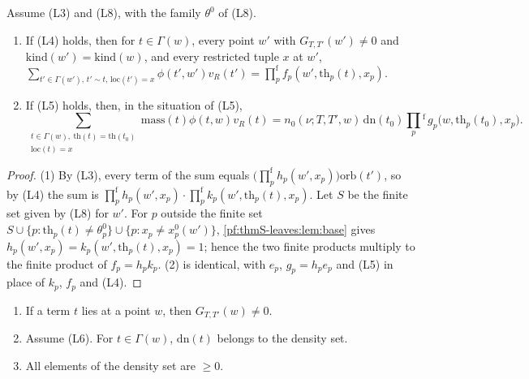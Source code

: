 \begin{proposition}\label{pf:thmS-leaves:prop:tuple}
Assume (L3) and (L8), with the family $\theta^0$ of (L8).
\begin{enumerate}
\item If (L4) holds, then for $t\in\Gamma(w)$, every point $w'$ with $G_{T,T'}(w')\ne0$ and $\mathrm{kind}(w')=\mathrm{kind}(w)$, and
every restricted tuple $x$ at $w'$,
$\sum_{t'\in\Gamma(w'),\,t'\sim t,\,\mathrm{loc}(t')=x}\phi(t',w')v_R(t')=\prod^{\mathrm f}_pf_p(w',\mathrm{th}_p(t),x_p)$.
\item If (L5) holds, then, in the situation of (L5),
\[
\sum_{\substack{t\in\Gamma(w),\ \mathrm{th}(t)=\mathrm{th}(t_0)\\ \mathrm{loc}(t)=x}}\mathrm{mass}(t)\phi(t,w)v_R(t)
=n_0(\nu;T,T',w)\,\mathrm{dn}(t_0)\prod_p{}^{\mathrm f}\,g_p\bigl(w,\mathrm{th}_p(t_0),x_p\bigr).
\]
\end{enumerate}
\end{proposition}

\begin{proof}
(1) By (L3), every term of the sum equals $\bigl(\prod^{\mathrm f}_ph_p(w',x_p)\bigr)\mathrm{orb}(t')$, so by (L4) the sum is
$\prod^{\mathrm f}_ph_p(w',x_p)\cdot\prod^{\mathrm f}_pk_p(w',\mathrm{th}_p(t),x_p)$. Let $S$ be the finite set given by (L8) for $w'$.
For $p$ outside the finite set $S\cup\{p:\mathrm{th}_p(t)\ne\theta^0_p\}\cup\{p:x_p\ne x^0_p(w')\}$, \cref{pf:thmS-leaves:lem:base}
gives $h_p(w',x_p)=k_p(w',\mathrm{th}_p(t),x_p)=1$; hence the two finite products multiply to the finite product of
$f_p=h_pk_p$. (2) is identical, with $e_p$, $g_p=h_pe_p$ and (L5) in place of $k_p$, $f_p$ and (L4).
\end{proof}

\begin{lemma}\label{pf:thmS-leaves:lem:atptG}
\begin{enumerate}
\item If a term $t$ lies at a point $w$, then $G_{T,T'}(w)\ne0$.
\item Assume (L6). For $t\in\Gamma(w)$, $\mathrm{dn}(t)$ belongs to the density set.
\item All elements of the density set are $\ge0$.
\end{enumerate}
\end{lemma}

